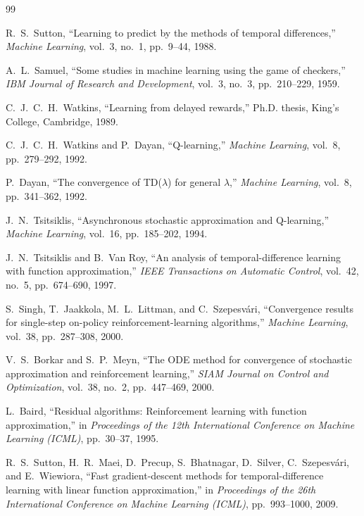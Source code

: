 \documentclass[11pt,a4paper]{article}
\theoremstyle{definition}
\theoremstyle{plain}
\theoremstyle{remark}
\begin{document}
\begin{thebibliography}{99}

R.~S.~Sutton, ``Learning to predict by the methods of temporal differences,''
\emph{Machine Learning}, vol.~3, no.~1, pp.~9--44, 1988.

A.~L.~Samuel, ``Some studies in machine learning using the game of checkers,''
\emph{IBM Journal of Research and Development}, vol.~3, no.~3, pp.~210--229, 1959.

C.~J.~C.~H.~Watkins, ``Learning from delayed rewards,''
Ph.D. thesis, King's College, Cambridge, 1989.

C.~J.~C.~H.~Watkins and P.~Dayan, ``Q-learning,''
\emph{Machine Learning}, vol.~8, pp.~279--292, 1992.

P.~Dayan, ``The convergence of TD($\lambda$) for general $\lambda$,''
\emph{Machine Learning}, vol.~8, pp.~341--362, 1992.

J.~N.~Tsitsiklis, ``Asynchronous stochastic approximation and Q-learning,''
\emph{Machine Learning}, vol.~16, pp.~185--202, 1994.

J.~N.~Tsitsiklis and B.~Van Roy, ``An analysis of temporal-difference learning with function approximation,''
\emph{IEEE Transactions on Automatic Control}, vol.~42, no.~5, pp.~674--690, 1997.

S.~Singh, T.~Jaakkola, M.~L.~Littman, and C.~Szepesv\'{a}ri,
``Convergence results for single-step on-policy reinforcement-learning algorithms,''
\emph{Machine Learning}, vol.~38, pp.~287--308, 2000.

V.~S.~Borkar and S.~P.~Meyn, ``The ODE method for convergence of stochastic approximation and reinforcement learning,''
\emph{SIAM Journal on Control and Optimization}, vol.~38, no.~2, pp.~447--469, 2000.

L.~Baird, ``Residual algorithms: Reinforcement learning with function approximation,''
in \emph{Proceedings of the 12th International Conference on Machine Learning (ICML)}, pp.~30--37, 1995.

R.~S.~Sutton, H.~R.~Maei, D.~Precup, S.~Bhatnagar, D.~Silver, C.~Szepesv\'{a}ri, and E.~Wiewiora,
``Fast gradient-descent methods for temporal-difference learning with linear function approximation,''
in \emph{Proceedings of the 26th International Conference on Machine Learning (ICML)}, pp.~993--1000, 2009.


\end{thebibliography}
\end{document}
